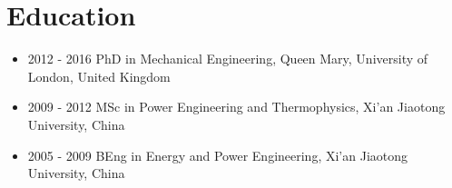 \documentclass[letterpaper]{article}
\begin{document}
\vspace{-12pt}
\section*{Education}
\vspace{-10pt}
\begin{itemize}
  \item 2012 - 2016 \hspace{2pt} PhD in Mechanical Engineering, Queen Mary, University of London, United Kingdom
  \item 2009 - 2012 \hspace{2pt} MSc in Power Engineering and Thermophysics, Xi’an Jiaotong University, China
  \item 2005 - 2009 \hspace{2pt} BEng in Energy and Power Engineering, Xi’an Jiaotong University, China
\end{itemize}

\vspace{-12pt}
\end{document}

